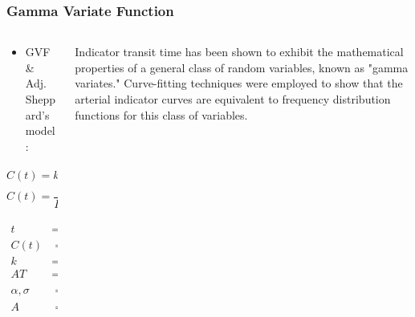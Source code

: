 %

\begin{frame}
  \frametitle{Gamma Variate Function}
    \cite{thompsonIndicatorTransitTime1964}
    \begin{columns}
    \begin{column}{0.45\textwidth}                 %
    {\small
    \begin{itemize}
        \item GVF \& Adj. Sheppard's model:
    \end{itemize}
    \begin{equation}
    C(t) = k(t - AT)^{\alpha} e^{-\frac{(t - AT)}{\sigma}}
    \end{equation}
    \begin{equation}
    C(t) = \frac{A (t - AT)^{\alpha}}{\Gamma(1 + \alpha) \sigma^{1+\alpha}} e^{-\frac{(t - AT)}{\sigma}}
    \end{equation}

    $\begin{aligned}
        t &= \text{time after injection} \\
        C(t) &= \text{indicator concentration at time, } t \\
        k &= \text{constant scale factor} \\
        AT &= \text{appearance time} \\
        \alpha, \sigma &= \text{arbitrary parameters, } 1/\sigma = Q/V \\
        A &= \text{total area under the curve, } I/Q
    \end{aligned}$
    }
    \end{column}
    
    \hspace*{4em}                                                          %
    
    \begin{column}{0.42\textwidth}                                %
        Indicator transit time has been shown to exhibit the mathematical properties of a general class of random variables, known as "gamma variates." Curve-fitting techniques were employed to show that the arterial indicator curves are equivalent to frequency distribution functions for this class of variables.
    \end{column}
    \end{columns}   %

\end{frame}

